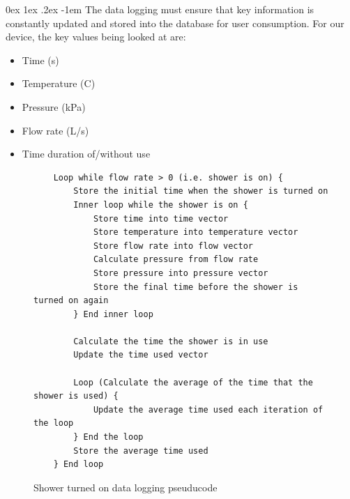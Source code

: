 \documentclass[12pt, a4paper]{article}
\makeatletter
\renewcommand\paragraph{\@startsection{paragraph}{5}{\parindent}%
  {0ex \@plus1ex \@minus.2ex}%
  {-1em}%
  {\normalfont\normalsize\bfseries}}
\makeatother
\begin{document}
                \paragraph{}
                    The data logging must ensure that key information is constantly updated and stored into the database for user consumption. For our device, the 
                    key values being looked at are:
                    \begin{itemize}
                        \item Time (s)
                        \item Temperature (\textdegree{}C)
                        \item Pressure (kPa)
                        \item Flow rate (L/s)
                        \item Time duration of/without use
                    \end{itemize}
                \footnotesize
                \begin{figure}[H]
                    \begin{lstlisting}
    Loop while flow rate > 0 (i.e. shower is on) {
        Store the initial time when the shower is turned on
        Inner loop while the shower is on {
            Store time into time vector
            Store temperature into temperature vector
            Store flow rate into flow vector
            Calculate pressure from flow rate
            Store pressure into pressure vector
            Store the final time before the shower is turned on again
        } End inner loop
                                       
        Calculate the time the shower is in use
        Update the time used vector
                                       
        Loop (Calculate the average of the time that the shower is used) {
            Update the average time used each iteration of the loop
        } End the loop
        Store the average time used
    } End loop
                    \end{lstlisting}
                    \caption{Shower turned on data logging pseuducode}
                \end{figure}
            \normalsize
            \footnotesize
\end{document}
